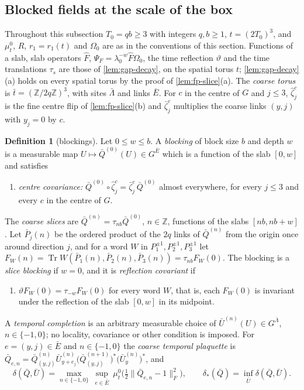 \documentclass[11pt,a4paper]{amsart}
\theoremstyle{definition}
\newtheorem{definition}[theorem]{Definition}
\theoremstyle{remark}
\numberwithin{equation}{section}
\DeclareMathOperator{\Tr}{Tr}        %
\newcommand{\Z}{\mathbb{Z}}          %
\newcommand{\norm}[1]{\lVert #1\rVert}     %
\newcommand{\cube}[1]{(2#1)^3}             %
\newcommand{\lzero}{\lambda_0}             %
\newcommand{\Omegazero}{\Omega_0}          %
\begin{document}
\subsection{Blocked fields at the scale of the box}\label{sec:box-disorder}

Throughout this subsection $T_0=qb\ge3$ with integers $q,b\ge1$, $t=\cube{T_0}$, and $\mu^0_t$, $R$, $r_1=r_1(t)$ and $\Omegazero$ are as in the conventions of this section. Functions of a slab, slab operators $\hat F$, $\Psi_F=\lzero^{-w}\hat F\Omegazero$, the time reflection $\vartheta$ and the time translations $\tau_s$ are those of \cref{lem:gap-decay}, on the spatial torus $t$; \cref{lem:gap-decay}(a) holds on every spatial torus by the proof of \cref{lem:fp-slice}(a). The \emph{coarse torus} is $\bar t=(\Z/2q\Z)^3$, with sites $\bar\Lambda$ and links $\bar E$. For $c$ in the centre of $G$ and $j\le3$, $\hat\zeta^c_j$ is the fine centre flip of \cref{lem:fp-slice}(b) and $\bar\zeta^c_j$ multiplies the coarse links $(y,j)$ with $y_j=0$ by $c$.

\begin{definition}[blockings]\label{def:blocking}
Let $0\le w\le b$. A \emph{blocking} of block size $b$ and depth $w$ is a measurable map $U\mapsto\bar Q^{(0)}(U)\in G^{\bar E}$ which is a function of the slab $[0,w]$ and satisfies
\begin{enumerate}[label=\textup{(B\arabic*)},leftmargin=*]
\item \emph{centre covariance:} $\bar Q^{(0)}\circ\hat\zeta^c_j=\bar\zeta^c_j\,\bar Q^{(0)}$ almost everywhere, for every $j\le3$ and every $c$ in the centre of $G$.
\end{enumerate}
The \emph{coarse slices} are $\bar Q^{(n)}=\tau_{nb}\bar Q^{(0)}$, $n\in\Z$, functions of the slabs $[nb,nb+w]$. Let $\bar P_j(n)$ be the ordered product of the $2q$ links of $\bar Q^{(n)}$ from the origin once around direction $j$, and for a word $W$ in $P_1^{\pm1},P_2^{\pm1},P_3^{\pm1}$ let $F_W(n)=\Tr W(\bar P_1(n),\bar P_2(n),\bar P_3(n))=\tau_{nb}F_W(0)$. The blocking is a \emph{slice blocking} if $w=0$, and it is \emph{reflection covariant} if
\begin{enumerate}[label=\textup{(B\arabic*)},leftmargin=*,resume]
\item $\vartheta F_W(0)=\tau_{-w}F_W(0)$ for every word $W$, that is, each $F_W(0)$ is invariant under the reflection of the slab $[0,w]$ in its midpoint.
\end{enumerate}
A \emph{temporal completion} is an arbitrary measurable choice of $\bar U^{(n)}(U)\in G^{\bar\Lambda}$, $n\in\{-1,0\}$; no locality, covariance or other condition is imposed. For $e=(y,j)\in\bar E$ and $n\in\{-1,0\}$ the \emph{coarse temporal plaquette} is $\bar Q_{e,n}=\bar Q^{(n)}_{(y,j)}\bar U^{(n)}_{y+e_j}\bigl(\bar Q^{(n+1)}_{(y,j)}\bigr)^*\bigl(\bar U^{(n)}_y\bigr)^*$, and
\[
\delta(\bar Q,\bar U)=\max_{n\in\{-1,0\}}\ \sup_{e\in\bar E}\ \mu^0_t\bigl(\tfrac12\norm{\bar Q_{e,n}-1}_F^2\bigr),\qquad \delta_*(\bar Q)=\inf_{\bar U}\delta(\bar Q,\bar U).
\]
\end{definition}
\end{document}
